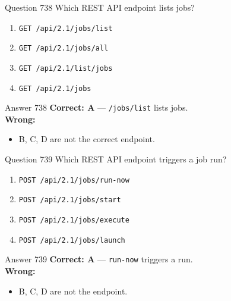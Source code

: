 \documentclass[aspectratio=169,11pt]{beamer}
\begin{document}
	\begin{frame}{Question 738}
		Which REST API endpoint lists jobs?
		\begin{enumerate}[label=\Alph*.]
			\item \texttt{GET /api/2.1/jobs/list}
			\item \texttt{GET /api/2.1/jobs/all}
			\item \texttt{GET /api/2.1/list/jobs}
			\item \texttt{GET /api/2.1/jobs}
		\end{enumerate}
	\end{frame}
	\begin{frame}{Answer 738}
		\textbf{Correct: A} --- \texttt{/jobs/list} lists jobs.\\
		\vspace{0.5em}
		\textbf{Wrong:}
		\begin{itemize}
			\item B, C, D are not the correct endpoint.
		\end{itemize}
	\end{frame}
	
	\begin{frame}{Question 739}
		Which REST API endpoint triggers a job run?
		\begin{enumerate}[label=\Alph*.]
			\item \texttt{POST /api/2.1/jobs/run-now}
			\item \texttt{POST /api/2.1/jobs/start}
			\item \texttt{POST /api/2.1/jobs/execute}
			\item \texttt{POST /api/2.1/jobs/launch}
		\end{enumerate}
	\end{frame}
	\begin{frame}{Answer 739}
		\textbf{Correct: A} --- \texttt{run-now} triggers a run.\\
		\vspace{0.5em}
		\textbf{Wrong:}
		\begin{itemize}
			\item B, C, D are not the endpoint.
		\end{itemize}
	\end{frame}
	
\end{document}
